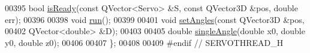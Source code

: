 \begin{DoxyCode}
00395     \textcolor{keywordtype}{bool} \hyperlink{a00009_a7a58c195c66f7d668b9344b82c7ac631}{isReady}(\textcolor{keyword}{const} QVector<Servo> &S, \textcolor{keyword}{const} QVector3D &pos, \textcolor{keywordtype}{double} err);
00396     
00398     \textcolor{keywordtype}{void} \hyperlink{a00009_aeeb31b85abf7eb5c701853a6d25e51e0}{run}();
00399     
00401     \textcolor{keywordtype}{void} \hyperlink{a00009_a2b9f97473d19a7defaed3451bc830f79}{setAngles}(\textcolor{keyword}{const} QVector3D &pos, 
00402                    QVector<double> &D);
00403     
00405     \textcolor{keywordtype}{double} \hyperlink{a00009_add4637d917a772c4c01a43b5b66da2be}{singleAngle}(\textcolor{keywordtype}{double} x0, \textcolor{keywordtype}{double} y0, \textcolor{keywordtype}{double} z0);
00406     
00407 \};
00408 
00409 \textcolor{preprocessor}{#endif // SERVOTHREAD\_H}
\end{DoxyCode}
